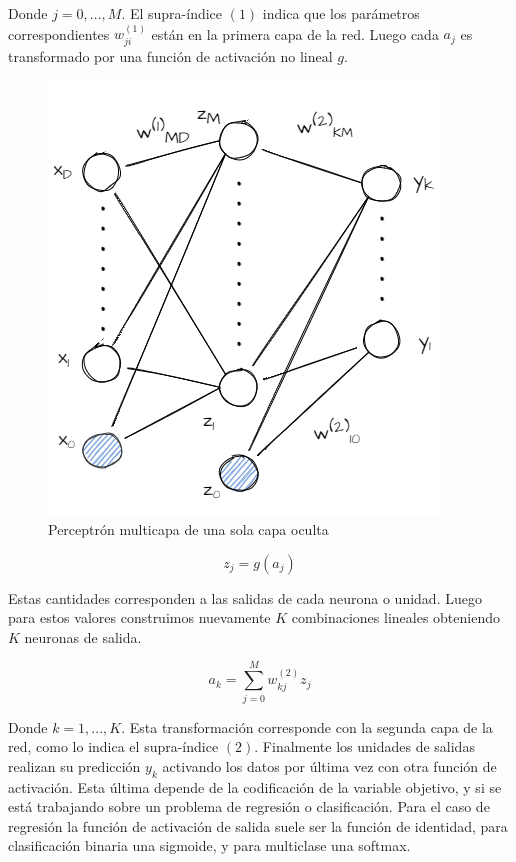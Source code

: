 Donde $j = 0,..., M$. El supra-índice $(1)$ indica que los parámetros
correspondientes $w_{ji}^{(1)}$ están en la primera capa de la red. Luego cada
$a_j$ es transformado por una función de activación no lineal $g$.

\begin{figure}
    \centering
    \includegraphics[scale=0.5]{figures/multilayer_perceptron.png}
    \caption{Perceptrón multicapa de una sola capa oculta}
    \label{fig:nn_multilayer_perceptron}
\end{figure}

\begin{equation}
    z_j = g(a_j)
\end{equation}

Estas cantidades corresponden a las salidas de cada neurona o unidad. Luego para
estos valores construimos nuevamente $K$ combinaciones lineales obteniendo $K$
neuronas de salida.

\begin{equation}
    a_k = \sum_{j=0}^{M} w_{kj}^{(2)}z_j
\end{equation}

Donde $k= 1,..., K$. Esta transformación corresponde con la segunda capa de la
red, como lo indica el supra-índice $(2)$. Finalmente los unidades de salidas
realizan su predicción $y_k$ activando los datos por última vez con otra función
de activación. Esta última depende de la codificación de la variable objetivo, y
si se está trabajando sobre un problema de regresión o clasificación. Para el
caso de regresión la función de activación de salida suele ser la función de
identidad, para clasificación binaria una sigmoide, y para multiclase una
softmax.

